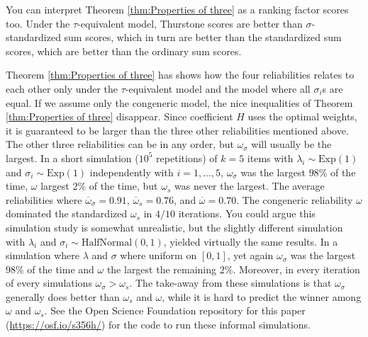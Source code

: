 \documentclass[twoside]{article}
\begin{document}
You can interpret Theorem \ref{thm:Properties of three} as a ranking factor scores too. Under the $\tau$-equivalent model, Thurstone scores are better than $\sigma$-standardized sum scores, which in turn are better than the standardized sum scores, which are
better than the ordinary sum scores.

Theorem \ref{thm:Properties of three} has shows how the four reliabilities relates to each other only under the $\tau$-equivalent model and the model where all $\sigma_i$s are equal. If we assume only the congeneric model, the nice inequalities of Theorem \ref{thm:Properties of three} disappear. Since coefficient $H$ uses the optimal weights, it is guaranteed to be larger than the three other reliabilities mentioned above. The
other three reliabilities can be in any order, but
$\omega_{\sigma}$ will usually be the largest. In a short
simulation ($10^{5}$ repetitions) of $k=5$ items with $\lambda_{i}\sim \textrm{Exp}(1)$
and $\sigma_{i}\sim \textrm{Exp}(1)$ independently with $i=1,\ldots,5$, $\omega_{\sigma}$
was the largest $98\%$ of the time, $\omega$ largest $2\%$
of the time, but $\omega_{s}$ was never the largest. The average reliabilities where $\overline{\omega}_\sigma = 0.91$, $\overline{\omega}_s= 0.76$, and $\overline{\omega} = 0.70$.
The congeneric reliability $\omega$ dominated the standardized $\omega_{s}$ in $4/10$ iterations. You could argue this simulation study
is somewhat unrealistic, but the slightly different simulation with $\lambda_{i}$ and $\sigma_{i}\sim \textrm{HalfNormal}(0,1)$, yielded virtually the same results. In a simulation where $\lambda$ and $\sigma$ where uniform on $[0,1]$, yet again $\omega_{\sigma}$
was the largest $98\%$ of the time and $\omega$ the largest the remaining $2\%$. Moreover, in every iteration of every simulations $\omega_\sigma > \omega_s$. The take-away from these simulations is that $\omega_{\sigma}$ generally does better than $\omega_{s}$ and
$\omega$, while it is hard to predict the winner among $\omega$
and $\omega_{s}$. See the Open Science Foundation repository for this paper (\url{https://osf.io/s356h/}) for the code to run these informal simulations.
\end{document}
